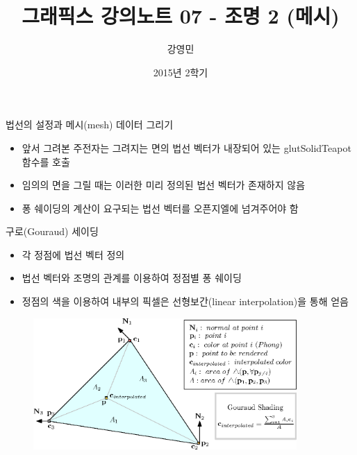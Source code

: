 \documentclass{beamer}
\title[3D 그래픽스 프로그래밍]{그래픽스 강의노트 07 - 조명 2 (메시)}
\author{강영민}
\institute{동명대학교}
\date{2015년 2학기}
\begin{document}
\begin{frame}
  \titlepage
\end{frame}





\begin{frame}[fragile]{법선의 설정과 메시(mesh) 데이터 그리기}

\begin{itemize}
\item 앞서 그려본 주전자는 그려지는 면의 법선 벡터가 내장되어 있는 {\sf glutSolidTeapot} 함수를 호출
\item 임의의 면을 그릴 때는 이러한 미리 정의된 법선 벡터가 존재하지 않음
\item 퐁 쉐이딩의 계산이 요구되는 법선 벡터를 오픈지엘에 넘겨주어야 함
\end{itemize}

\end{frame}



\begin{frame}[fragile]{구로(Gouraud) 세이딩}

\begin{itemize}
\item 각 정점에 법선 벡터 정의
\item 법선 벡터와 조명의 관계를 이용하여 정점별 퐁 쉐이딩
\item 정점의 색을 이용하여 내부의 픽셀은 선형보간(linear interpolation)을 통해 얻음
\end{itemize}

\begin{figure}[h!]
  \centering
    \includegraphics[height=5cm]{OGL_light/interpolatedColors.eps}
\end{figure}
\end{frame}
\end{document}
